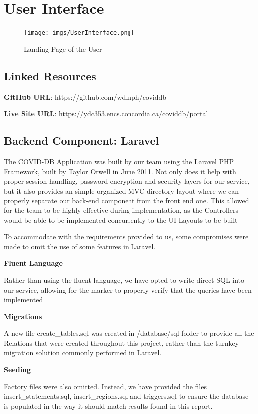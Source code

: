 \documentclass{article}
\begin{document}
\newpage
\section{User Interface}

\begin{figure}[H]
    \centering
    \texttt{[image: imgs/UserInterface.png]}
    \caption{Landing Page of the User}
\end{figure}

\subsection{Linked Resources}

\textbf{GitHub URL}: https://github.com/wdlnph/coviddb

\textbf{Live Site URL}: https://ydc353.encs.concordia.ca/coviddb/portal

\subsection{Backend Component: Laravel}

The COVID-DB Application was built by our team using the Laravel PHP Framework, built by Taylor Otwell in June 2011. Not only does it help with proper session handling, password encryption and security layers for our service, but it also provides an simple organized MVC directory layout where we can properly separate our back-end component from the front end one. This allowed for the team to be highly effective during implementation, as the Controllers would be able to be implemented concurrently to the UI Layouts to be built

To accommodate with the requirements provided to us, some compromises were made to omit the use of some features in Laravel.

\textbf{Fluent Language}

Rather than using the fluent language, we have opted to write direct SQL into our service, allowing for the marker to properly verify that the queries have been implemented

\textbf{Migrations}

A new file create\_tables.sql was created in /database/sql folder to provide all the Relations that were created throughout this project, rather than the turnkey migration solution commonly performed in Laravel.

\textbf{Seeding}

Factory files were also omitted. Instead, we have provided the files insert\_statements.sql, insert\_regions.sql and triggers.sql to ensure the database is populated in the way it should match results found in this report.
\end{document}
